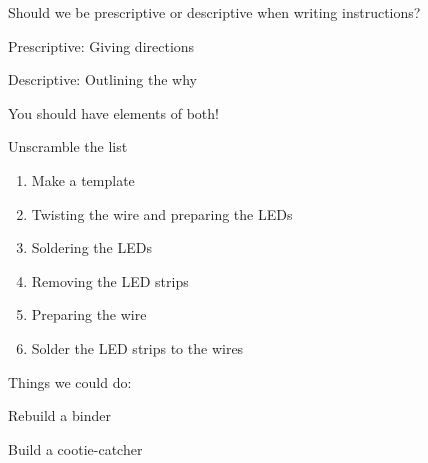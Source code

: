 \documentclass[a4paper]{article}
\begin{document}
\begin{list}{}{ }
\item Should we be prescriptive or descriptive when writing instructions?
	\begin{list}{ }{ }
	\item Prescriptive: Giving directions
	\item Descriptive: Outlining the why
	\end{list}
\item You should have elements of both!
\end{list}


Unscramble the list

\begin{enumerate}
	\item Make a template
	\item Twisting the wire and preparing the LEDs
	\item Soldering the LEDs
	\item Removing the LED strips
	\item Preparing the wire
	\item Solder the LED strips to the wires
\end{enumerate}

Things we could do:

\begin{list}{}{}
	\item Rebuild a binder
	\item Build a cootie-catcher

\end{list}
\end{document}
